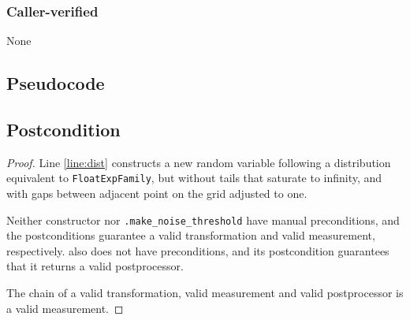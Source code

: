 \documentclass{article}
\begin{document}
\subsubsection*{Caller-verified}
None

\subsection*{Pseudocode}


\subsection*{Postcondition}
\begin{theorem}
\end{theorem}

\begin{proof}
    Line \ref{line:dist} constructs a new random variable following a distribution equivalent to \texttt{FloatExpFamily},
    but without tails that saturate to infinity, and with gaps between adjacent point on the grid adjusted to one.

    Neither constructor  nor
    \texttt{.make\_noise\_threshold} have manual preconditions,
    and the postconditions guarantee a valid transformation and valid measurement, respectively.
     also does not have preconditions,
    and its postcondition guarantees that it returns a valid postprocessor.

    The chain of a valid transformation, valid measurement and valid postprocessor is a valid measurement.
\end{proof}
\end{document}
